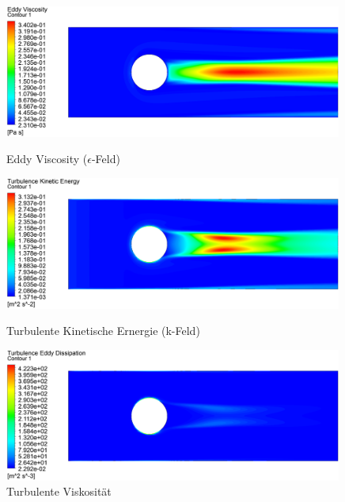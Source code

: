 \begin{figure}
  \centering
  \includegraphics[width=0.99\textwidth]{papers/reynolds/croppedimages/eddy-viscosity.png}
  \caption{Eddy Viscosity ($\epsilon$-Feld)}
  \label{fig:e}
  \vspace*{16pt}
  \includegraphics[width=0.99\textwidth]{papers/reynolds/croppedimages/turbulence-kinetic-energy.png}
  \caption{Turbulente Kinetische Ernergie (k-Feld)}
  \label{fig:k}
  \vspace*{16pt}
  \includegraphics[width=0.99\textwidth]{papers/reynolds/croppedimages/turbulent-viscosity.png}
  \caption{Turbulente Viskosität}
  \label{fig:mu-t}
\end{figure}
